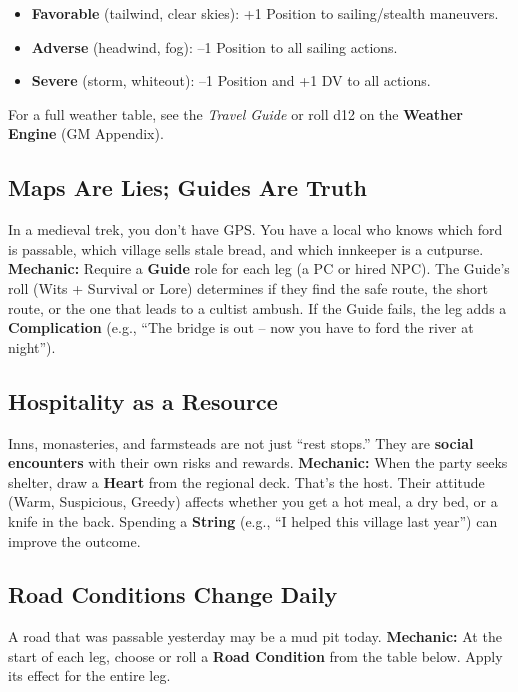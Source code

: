 \begin{tcolorbox}[colback=blue!5!white, colframe=blue!75!black, title=Weather as Position Modifier]
  \begin{itemize}
    \item \textbf{Favorable} (tailwind, clear skies): +1 Position to sailing/stealth maneuvers.
    \item \textbf{Adverse} (headwind, fog): –1 Position to all sailing actions.
    \item \textbf{Severe} (storm, whiteout): –1 Position and +1 DV to all actions.
  \end{itemize}
  For a full weather table, see the \textit{Travel Guide} or roll d12 on the \textbf{Weather Engine} (GM Appendix).
\end{tcolorbox}

\subsection{Maps Are Lies; Guides Are Truth}
In a medieval trek, you don't have GPS. You have a local who knows which ford is passable, which village sells stale bread, and which innkeeper is a cutpurse.  
\textbf{Mechanic:} Require a \textbf{Guide} role for each leg (a PC or hired NPC). The Guide’s roll (Wits + Survival or Lore) determines if they find the safe route, the short route, or the one that leads to a cultist ambush. If the Guide fails, the leg adds a \textbf{Complication} (e.g., “The bridge is out – now you have to ford the river at night”).

\subsection{Hospitality as a Resource}
Inns, monasteries, and farmsteads are not just “rest stops.” They are \textbf{social encounters} with their own risks and rewards.  
\textbf{Mechanic:} When the party seeks shelter, draw a \textbf{Heart} from the regional deck. That’s the host. Their attitude (Warm, Suspicious, Greedy) affects whether you get a hot meal, a dry bed, or a knife in the back. Spending a \textbf{String} (e.g., “I helped this village last year”) can improve the outcome.

\subsection{Road Conditions Change Daily}
A road that was passable yesterday may be a mud pit today.  
\textbf{Mechanic:} At the start of each leg, choose or roll a \textbf{Road Condition} from the table below. Apply its effect for the entire leg.

